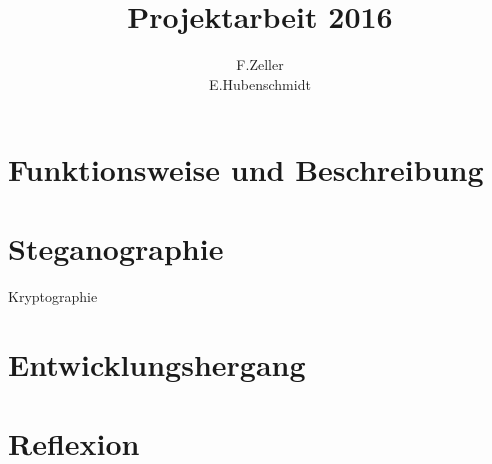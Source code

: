 \documentclass[11pt]{article}
\begin{document}

\title{Projektarbeit 2016}
\author{F.Zeller\\E.Hubenschmidt}
\maketitle
\newpage

\tableofcontents
\newpage

\section{Funktionsweise und Beschreibung}




\newpage
\section{Steganographie}

Kryptographie



\newpage
\section{Entwicklungshergang}


\newpage
\section{Reflexion}





\newpage
\renewcommand{\indexname}{Stichwortverzeichnis}


\printindex
\end{document}
